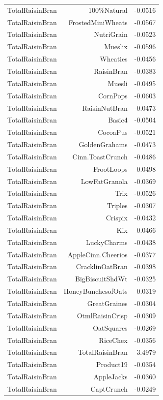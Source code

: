 \begin{longtable}{@{}lrr@{}}
TotalRaisinBran & 100\%Natural & -0.0516 \\
TotalRaisinBran & FrostedMiniWheats & -0.0567 \\
TotalRaisinBran & NutriGrain & -0.0523 \\
TotalRaisinBran & Mueslix & -0.0596 \\
TotalRaisinBran & Wheaties & -0.0456 \\
TotalRaisinBran & RaisinBran & -0.0383 \\
TotalRaisinBran & Muesli & -0.0495 \\
TotalRaisinBran & CornPops & -0.0603 \\
TotalRaisinBran & RaisinNutBran & -0.0473 \\
TotalRaisinBran & Basic4 & -0.0504 \\
TotalRaisinBran & CocoaPus & -0.0521 \\
TotalRaisinBran & GoldenGrahams & -0.0473 \\
TotalRaisinBran & Cinn.ToastCrunch & -0.0486 \\
TotalRaisinBran & FrootLoops & -0.0498 \\
TotalRaisinBran & LowFatGranola & -0.0369 \\
TotalRaisinBran & Trix & -0.0526 \\
TotalRaisinBran & Triples & -0.0307 \\
TotalRaisinBran & Crispix & -0.0432 \\
TotalRaisinBran & Kix & -0.0466 \\
TotalRaisinBran & LuckyCharms & -0.0438 \\
TotalRaisinBran & AppleCinn.Cheerios & -0.0377 \\
TotalRaisinBran & CracklinOatBran & -0.0398 \\
TotalRaisinBran & BigBiscuitShdWt & -0.0325 \\
TotalRaisinBran & HoneyBunchesofOats & -0.0319 \\
TotalRaisinBran & GreatGraines & -0.0304 \\
TotalRaisinBran & OtmlRaisinCrisp & -0.0309 \\
TotalRaisinBran & OatSquares & -0.0269 \\
TotalRaisinBran & RiceChex & -0.0356 \\
TotalRaisinBran & TotalRaisinBran & 3.4979 \\
TotalRaisinBran & Product19 & -0.0354 \\
TotalRaisinBran & AppleJacks & -0.0360 \\
TotalRaisinBran & CaptCrunch & -0.0249 \\

\end{longtable}
